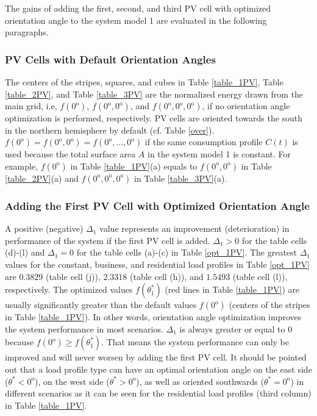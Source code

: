 The gains of adding the first, second, and third PV cell with optimized orientation angle to the system model 1 are evaluated in the following paragraphs.
\subsubsection{PV Cells with Default Orientation Angles}
The centers of the stripes, squares, and cubes in Table \ref{table_1PV}, Table \ref{table_2PV}, and Table \ref{table_3PV} are the normalized energy drawn
from the main grid, i.e, $f(0^\mathrm{o})$, $f(0^\mathrm{o},0^\mathrm{o})$, and $f(0^\mathrm{o},0^\mathrm{o},0^\mathrm{o})$, if no orientation angle optimization is performed, respectively. PV cells are oriented towards the south in the northern hemisphere by default (cf. Table \ref{over}). $f(0^\mathrm{o})=f(0^\mathrm{o},0^\mathrm{o})=f(0^\mathrm{o},...,0^\mathrm{o})$ if the same consumption profile $C(t)$ is used because the total surface area $A$ in the system model 1 is constant. For example, $f(0^\mathrm{o})$ in Table \ref{table_1PV}(a) equals to $f(0^\mathrm{o},0^\mathrm{o})$ in Table \ref{table_2PV}(a) and $f(0^\mathrm{o},0^\mathrm{o},0^\mathrm{o})$ in Table \ref{table_3PV}(a). 

\subsubsection{Adding the First PV Cell with Optimized Orientation Angle}
A positive (negative) $\Delta_1$ value represents an improvement (deterioration) in performance of the system if the first PV cell is added. 
$\Delta_1>0$ for the table cells (d)-(l) and $\Delta_1=0$ for the table cells (a)-(c) in Table \ref{opt_1PV}. The greatest $\Delta_1$ values for the constant, business, and residential load profiles in Table \ref{opt_1PV} are $0.3829$ (table cell (j)), $2.3318$ (table cell (h)), and $1.5493$ (table cell (l)), respectively. The optimized values $f(\theta_1^*)$ (red lines in Table \ref{table_1PV}) are usually significantly greater than the default values $f(0^\mathrm{o})$ (centers of the stripes in Table \ref{table_1PV}). In other words, orientation angle optimization improves the system performance in most scenarios. $\Delta_1$ is always greater or equal to $0$ because $f(0^\mathrm{o})\geq f(\theta_1^*)$. That means the system performance can only be improved and will never worsen by adding the first PV cell. It should be pointed out that a load profile type can have an optimal orientation angle on the east side ($\theta^*<0^{\mathrm{o}}$), on the west side ($\theta^*>0^{\mathrm{o}}$), as well as oriented southwards ($\theta^*=0^{\mathrm{o}}$) in different scenarios as it can be seen for the residential load profiles (third column) in Table \ref{table_1PV}.

